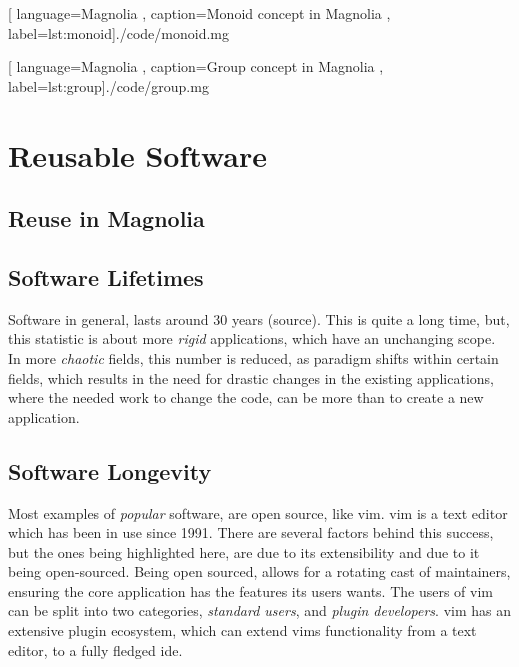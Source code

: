 \begin{center}
  
    [ language=Magnolia
    , caption={Monoid concept in Magnolia}
    , label=lst:monoid]{./code/monoid.mg}
\end{center}

\begin{center}
  
    [ language=Magnolia
    , caption={Group concept in Magnolia}
    , label=lst:group]{./code/group.mg}
\end{center}

\section{Reusable Software}

\subsection{Reuse in Magnolia}

\subsection{Software Lifetimes}

Software in general, lasts around 30 years (source). This is quite a long time,
but, this statistic is about more \textit{rigid} applications, which have an
unchanging scope. In more \textit{chaotic} fields, this number is reduced, as
paradigm shifts within certain fields, which results in the need for drastic
changes in the existing applications, where the needed work to change the code,
can be more than to create a new application.

\subsection{Software Longevity}

Most examples of \textit{popular} software, are open source, like \gls{vim}.
\gls{vim} is a text editor which has been in use since 1991. There are several
factors behind this success, but the ones being highlighted here, are due to its
extensibility and due to it being open-sourced. Being open sourced, allows for a
rotating cast of maintainers, ensuring the core application has the features its
users wants. The users of \gls{vim} can be split into two categories,
\textit{standard users}, and \textit{plugin developers}. \gls{vim} has an
extensive plugin ecosystem, which can extend \gls{vim}s functionality from a
text editor, to a fully fledged \gls{ide}.

